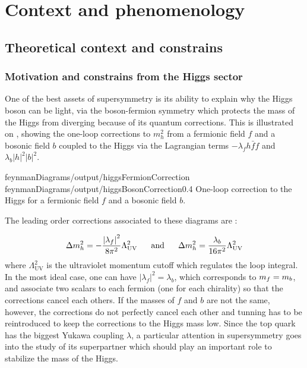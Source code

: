     \section{Context and phenomenology \label{sec:analysis_contextAndPheno}}

        \subsection{Theoretical context and constrains}

        \subsubsection{Motivation and constrains from the Higgs sector}

            One of the best assets of supersymmetry is its ability to explain why the Higgs
            boson can be light, via the boson-fermion symmetry which protects the mass
            of the Higgs from diverging because of its quantum corrections. This is illustrated on
            , showing the one-loop corrections to $m_h^2$
            from a fermionic field $f$ and a bosonic field $b$ coupled to the Higgs via the
            Lagrangian terms $- \lambda_f h \bar{f} f$ and $\lambda_b \left| h \right|^2 \left| b \right|^2$.

            {feynmanDiagrams/output/higgsFermionCorrection}
            {feynmanDiagrams/output/higgsBosonCorrection}{0.4}
            {One-loop correction to the Higgs for a fermionic field $f$ and a bosonic field $b$.}

            The leading order corrections associated to these diagrams are :

            \begin{equation}
                \Delta m_{h}^2 = - \frac{\left| \lambda_f \right|^2}{8\pi^2} \Lambda^2_{\text{UV}}
                \, \, \, \, \, \, \, \, \, \, \text{and} \, \, \, \, \, \, \, \, \, \,
                \Delta m_{h}^2 =   \frac{\lambda_b}{16\pi^2} \Lambda^2_{\text{UV}}
            \end{equation}
            where $\Lambda^2_{\text{UV}}$ is the ultraviolet momentum cutoff which regulates
            the loop integral. In the most ideal case, one can have $\left| \lambda_f \right|^2
            = \lambda_b$, which corresponds to $m_{f} = m_{b}$, and associate two scalars
            to each fermion (one for each chirality) so that the corrections cancel each others.
            If the masses of $f$ and $b$ are not the same, however, the corrections do not
            perfectly cancel each other and tunning has to be reintroduced to keep the
            corrections to the Higgs mass low. Since the top quark has the biggest Yukawa coupling $\lambda$, a
            particular attention in supersymmetry goes into the study of its superpartner
            which should play an important role to stabilize the mass of the Higgs.

